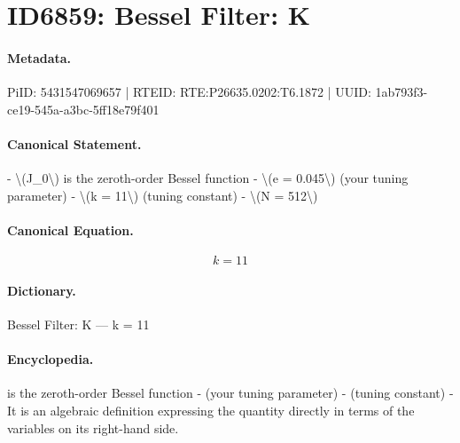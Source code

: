 \section*{ID6859: Bessel Filter: K}
\paragraph{Metadata.}
PiID: 5431547069657 | RTEID: RTE:P26635.0202:T6.1872 | UUID: 1ab793f3-ce19-545a-a3bc-5ff18e79f401

\paragraph{Canonical Statement.}
- \textbackslash{}(J\_0\textbackslash{}) is the zeroth-order Bessel function - \textbackslash{}(e = 0.045\textbackslash{}) (your tuning parameter) - \textbackslash{}(k = 11\textbackslash{}) (tuning constant) - \textbackslash{}(N = 512\textbackslash{})

\paragraph{Canonical Equation.}
\[
k = 11
\]

\paragraph{Dictionary.}
Bessel Filter: K — k = 11

\paragraph{Encyclopedia.}
is the zeroth-order Bessel function - (your tuning parameter) - (tuning constant) - It is an algebraic definition expressing the quantity directly in terms of the variables on its right-hand side.
